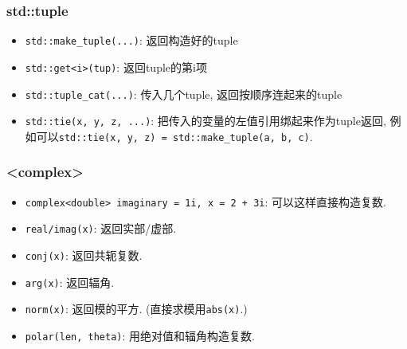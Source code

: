 \subsubsection{std::tuple}

\begin{itemize}
	\item \texttt{std::make_tuple(...)}: 返回构造好的tuple
	\item \texttt{std::get<i>(tup)}: 返回tuple的第i项
	\item \texttt{std::tuple_cat(...)}: 传入几个tuple, 返回按顺序连起来的tuple
	\item \texttt{std::tie(x, y, z, ...)}: 把传入的变量的左值引用绑起来作为tuple返回, 例如可以\texttt{std::tie(x, y, z) = std::make_tuple(a, b, c)}.
\end{itemize}

\subsubsection{<complex>}

\begin{itemize}
	\item \texttt{complex<double> imaginary = 1i, x = 2 + 3i}: 可以这样直接构造复数.
	\item \texttt{real/imag(x)}: 返回实部/虚部.
	\item \texttt{conj(x)}: 返回共轭复数.
	\item \texttt{arg(x)}: 返回辐角.
	\item \texttt{norm(x)}: 返回模的平方. (直接求模用\texttt{abs(x)}.)
	\item \texttt{polar(len, theta)}: 用绝对值和辐角构造复数.
\end{itemize}